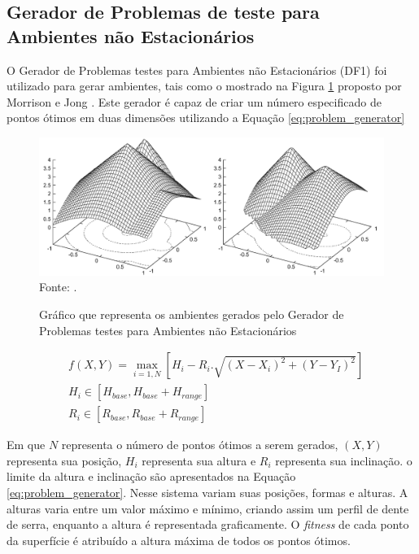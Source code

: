 \subsection{Gerador de Problemas de teste para Ambientes não Estacionários}
\label{sec:df1_generator}

O Gerador de Problemas testes para Ambientes não Estacionários (DF1) foi utilizado para gerar ambientes, tais como o mostrado na Figura \ref{fig:problem_generator} proposto por Morrison e Jong \cite{morrison1999test}. Este gerador é capaz de criar um número especificado de pontos ótimos em duas dimensões utilizando a Equação \ref{eq:problem_generator} 

\begin{figure}[!htb]
	\caption{Gráfico que representa os ambientes gerados pelo Gerador de Problemas testes para Ambientes não Estacionários}
	\centering
	\includegraphics[scale=0.31]{images/bm_generator.png}
	\label{fig:problem_generator}{\\Fonte: .}
\end{figure}

\begin{equation}
\label{eq:problem_generator}
\begin{split}
& f(X,Y) = \max_{i=1,N}\left[H_i - R_i . \sqrt{(X - X_i)^2 + (Y - Y_I)^2}\right] \\
& H_i \in [H_{base}, H_{base} + H_{range}] \\
& R_i \in [R_{base}, R_{base} + R_{range}]
\end{split}
\end{equation}

\noindent Em que $N$ representa o número de pontos ótimos a serem gerados, $(X,Y)$ representa sua posição, $H_i$ representa sua altura e $R_i$ representa sua inclinação. o limite da altura e inclinação são apresentados na Equação \ref{eq:problem_generator}. Nesse sistema variam suas posições, formas e alturas. A alturas varia entre um valor máximo e mínimo, criando assim um perfil de dente de serra, enquanto a altura é representada graficamente. O \textit{fitness} de cada ponto da superfície é atribuído a altura máxima de todos os pontos ótimos.

